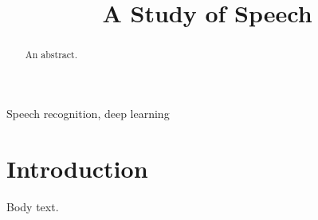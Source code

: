 \documentclass{article}
\title{A Study of Speech}
\begin{document}
\ninept
\maketitle
\begin{abstract}
An abstract.
\end{abstract}
\begin{keywords}
Speech recognition, deep learning
\end{keywords}
\section{Introduction}
Body text.
\end{document}
